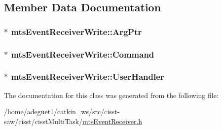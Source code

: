 \subsection{Member Data Documentation}
\hypertarget{classmts_event_receiver_write_ac001e32506dc7feb428a18ae7d80bbe8}{
\subsubsection[{Arg\-Ptr}]{$\ast$ mts\-Event\-Receiver\-Write\-::\-Arg\-Ptr\hspace{0.3cm}{\ttfamily [protected]}}}\label{classmts_event_receiver_write_ac001e32506dc7feb428a18ae7d80bbe8}
\hypertarget{classmts_event_receiver_write_a60b0cbe48b277b5130576c5009b8851e}{
\subsubsection[{Command}]{$\ast$ mts\-Event\-Receiver\-Write\-::\-Command\hspace{0.3cm}{\ttfamily [protected]}}}\label{classmts_event_receiver_write_a60b0cbe48b277b5130576c5009b8851e}
\hypertarget{classmts_event_receiver_write_a9ad8837c3e250203c0b0e8ce4112024d}{
\subsubsection[{User\-Handler}]{$\ast$ mts\-Event\-Receiver\-Write\-::\-User\-Handler\hspace{0.3cm}{\ttfamily [protected]}}}\label{classmts_event_receiver_write_a9ad8837c3e250203c0b0e8ce4112024d}


The documentation for this class was generated from the following file\-:\begin{DoxyCompactItemize}
\item 
/home/adeguet1/catkin\-\_\-ws/src/cisst-\/saw/cisst/cisst\-Multi\-Task/\hyperlink{mts_event_receiver_8h}{mts\-Event\-Receiver.\-h}\end{DoxyCompactItemize}
